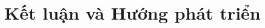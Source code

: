 \documentclass{report}
\begin{document}
\chapter{Kết luận và Hướng phát triển}
\label{chap:ketluan}

\nocite{*}


\appendix
{}
\end{document}
